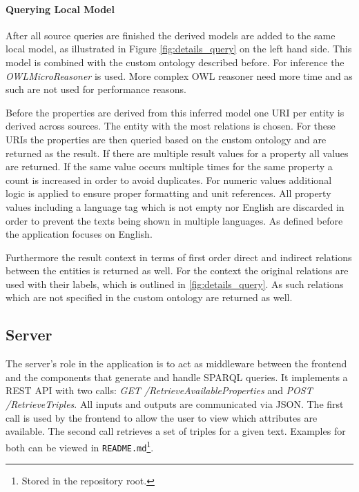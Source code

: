 \paragraph{Querying Local Model}
After all source queries are finished the derived models are added to the same local model, as illustrated in Figure \ref{fig:details_query} on the left hand side. This model is combined with the custom ontology described before. For inference the \textit{OWLMicroReasoner} is used. More complex OWL reasoner need more time and as such are not used for performance reasons. 

Before the properties are derived from this inferred model one URI per entity is derived across sources. The entity with the most relations is chosen. 
For these URIs the properties are then queried based on the custom ontology and are returned as the result. If there are multiple result values for a property all values are returned. If the same value occurs multiple times for the same property a count is increased in order to avoid duplicates. For numeric values additional logic is applied to ensure proper formatting and unit references. All property values including a language tag which is not empty nor English are discarded in order to prevent the texts being shown in multiple languages. As defined before the application focuses on English. 

Furthermore the result context in terms of first order direct and indirect relations between the entities is returned as well. For the context the original relations are used with their labels, which is outlined in \ref{fig:details_query}. As such relations which are not specified in the custom ontology are returned as well. 

\subsection{Server} 
\label{sec:server}
The server's role in the application is to act as middleware between the frontend and the components that generate and handle SPARQL queries. It implements a REST API with two calls: \textit{GET /RetrieveAvailableProperties} and \textit{POST /RetrieveTriples}. All inputs and outputs are communicated via JSON. The first call is used by the frontend to allow the user to view which attributes are available. The second call retrieves a set of triples for a given text. Examples for both can be viewed in \texttt{README.md}\footnote{Stored in the repository root.}. 

